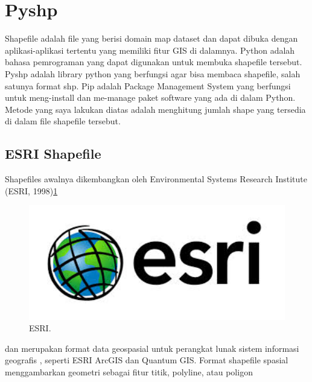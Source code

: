 
\section{Pyshp}
Shapefile adalah file yang berisi domain map dataset dan dapat dibuka dengan aplikasi-aplikasi tertentu yang memiliki fitur GIS di dalamnya.
Python adalah bahasa pemrograman yang dapat digunakan untuk membuka shapefile tersebut.
Pyshp adalah library python yang berfungsi agar bisa membaca shapefile, salah satunya format shp.
Pip adalah Package Management System yang berfungsi untuk meng-install dan me-manage paket software yang ada di dalam Python.
Metode yang saya lakukan diatas adalah menghitung jumlah shape yang tersedia di dalam file shapefile tersebut.

\subsection{ESRI Shapefile}
	
Shapefiles awalnya dikembangkan oleh Environmental Systems Research Institute (ESRI, 1998)\ref{esri}
	\begin{figure}[ht]
	\centerline{\includegraphics[width=1\textwidth]{figures/esri.JPG}}
	\caption{ESRI.}
	\label{esri}
	\end{figure}
	dan merupakan format data geospasial untuk perangkat lunak sistem informasi geografis , seperti ESRI ArcGIS dan Quantum GIS.
	Format shapefile spasial menggambarkan geometri sebagai fitur titik, polyline, atau poligon

